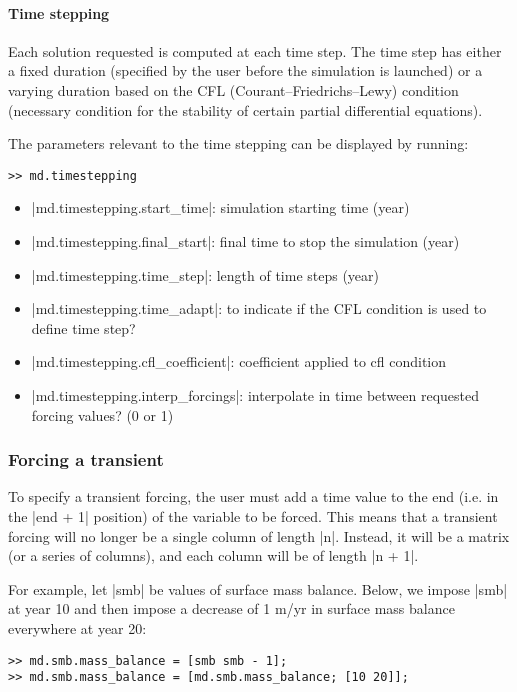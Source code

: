 \paragraph{Time stepping}
Each solution requested is computed at each time step. The time step has either a fixed duration (specified by the user before the simulation is launched) or a varying duration based on the CFL (Courant–Friedrichs–Lewy) condition (necessary condition for the stability of certain partial differential equations).

The parameters relevant to the time stepping can be displayed by running:
\begin{lstlisting}
>> md.timestepping
\end{lstlisting}

\begin{itemize}
	\item \lstinlinebg|md.timestepping.start_time|: simulation starting time (year)
	\item \lstinlinebg|md.timestepping.final_start|: final time to stop the simulation (year)
	\item \lstinlinebg|md.timestepping.time_step|: length of time steps (year)
	\item \lstinlinebg|md.timestepping.time_adapt|: to indicate if the CFL condition is used to define time step?
	\item \lstinlinebg|md.timestepping.cfl_coefficient|: coefficient applied to cfl condition
	\item \lstinlinebg|md.timestepping.interp_forcings|: interpolate in time between requested forcing values? (0 or 1)
\end{itemize}

\subsubsection{Forcing a transient}
To specify a transient forcing, the user must add a time value to the end (i.e. in the \lstinlinebg|end + 1| position) of the variable to be forced. This means that a transient forcing will no longer be a single column of length \lstinlinebg|n|. Instead, it will be a matrix (or a series of columns), and each column will be of length \lstinlinebg|n + 1|.

For example, let \lstinlinebg|smb| be values of surface mass balance. Below, we impose \lstinlinebg|smb| at year 10 and then impose a decrease of 1 m/yr in surface mass balance everywhere at year 20:
\begin{lstlisting}
>> md.smb.mass_balance = [smb smb - 1];
>> md.smb.mass_balance = [md.smb.mass_balance; [10 20]];
\end{lstlisting}

